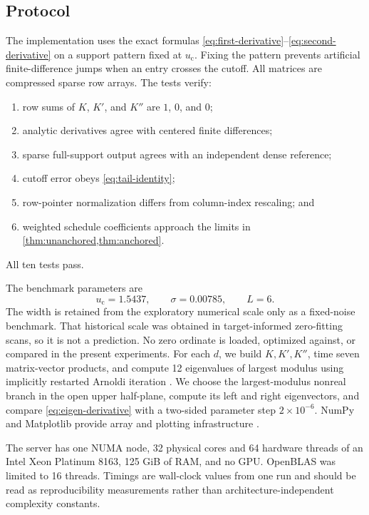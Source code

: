 \documentclass[11pt]{article}
\theoremstyle{definition}
\theoremstyle{remark}
\newcommand{\uc}{u_{\mathrm c}}
\begin{document}
\subsection{Protocol}

The implementation uses the exact formulas
\eqref{eq:first-derivative}--\eqref{eq:second-derivative} on a support pattern
fixed at $\uc$.  Fixing the pattern prevents artificial finite-difference
jumps when an entry crosses the cutoff.  All matrices are compressed sparse
row arrays.  The tests verify:
\begin{enumerate}[label=(\roman*),leftmargin=2.2em]
  \item row sums of $K$, $K'$, and $K''$ are $1$, $0$, and $0$;
  \item analytic derivatives agree with centered finite differences;
  \item sparse full-support output agrees with an independent dense
  reference;
  \item cutoff error obeys \eqref{eq:tail-identity};
  \item row-pointer normalization differs from column-index rescaling; and
  \item weighted schedule coefficients approach the limits in
  \cref{thm:unanchored,thm:anchored}.
\end{enumerate}
All ten tests pass.

The benchmark parameters are
\[
  \uc=1.5437,\qquad \sigma=0.00785,\qquad L=6.
\]
The width is retained from the exploratory numerical scale only as a
fixed-noise benchmark.  That historical scale was obtained in target-informed
zero-fitting scans, so it is not a prediction.  No zero ordinate is loaded,
optimized against, or compared in the present experiments.
For each $d$, we build $K,K',K''$, time seven matrix-vector products, and
compute 12 eigenvalues of largest modulus using implicitly restarted Arnoldi
iteration \citep{LehoucqSorensenYang1998,VirtanenEtAl2020}.  We choose the
largest-modulus nonreal branch in the open upper half-plane, compute its left
and right eigenvectors, and compare \eqref{eq:eigen-derivative} with a
two-sided parameter step $2\times10^{-6}$.  NumPy and Matplotlib provide
array and plotting infrastructure \citep{HarrisEtAl2020,Hunter2007}.

The server has one NUMA node, 32 physical cores and 64 hardware threads of an
Intel Xeon Platinum 8163, 125 GiB of RAM, and no GPU.  OpenBLAS was limited
to 16 threads.  Timings are wall-clock values from one run and should be
read as reproducibility measurements rather than architecture-independent
complexity constants.
\end{document}
